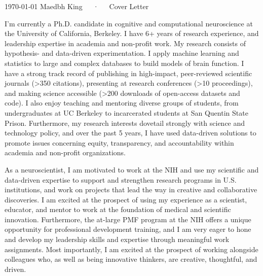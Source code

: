 \documentclass[9pt, a4paper]{maedbh-cv}
\begin{document}
\makecvheader[R]

\makecvfooter
  {\today}
  {Maedbh King~~~·~~~Cover Letter}
  {}
  
\makelettertitle

\begin{cvletter}

I'm currently a Ph.D. candidate in cognitive and computational neuroscience at the University of California, Berkeley. I have 6+ years of research experience, and leadership expertise in academia and non-profit work. My research consists of hypothesis- and data-driven experimentation. I apply machine learning and statistics to large and complex databases to build models of brain function. I have a strong track record of publishing in high-impact, peer-reviewed scientific journals (>350 citations), presenting at research conferences (>10 proceedings), and making science accessible (>200 downloads of open-access datasets and code). I also enjoy teaching and mentoring diverse groups of students, from undergraduates at UC Berkeley to incarcerated students at San Quentin State Prison. Furthermore, my research interests dovetail strongly with science and technology policy, and over the past 5 years, I have used data-driven solutions to promote issues concerning equity, transparency, and accountability within academia and non-profit organizations. 

As a neuroscientist, I am motivated to work at the NIH and use my scientific and data-driven expertise to support and strengthen research programs in U.S. institutions, and work on projects that lead the way in creative and collaborative discoveries. I am excited at the prospect of using my experience as a scientist, educator, and mentor to work at the foundation of medical and scientific innovation. Furthermore, the at-large PMF program at the NIH offers a unique opportunity for professional development training, and I am very eager to hone and develop my leadership skills and expertise through meaningful work assignments. Most importantly, I am excited at the prospect of working alongside colleagues who, as well as being innovative thinkers, are creative, thoughtful, and driven. 


\end{cvletter}
\end{document}
